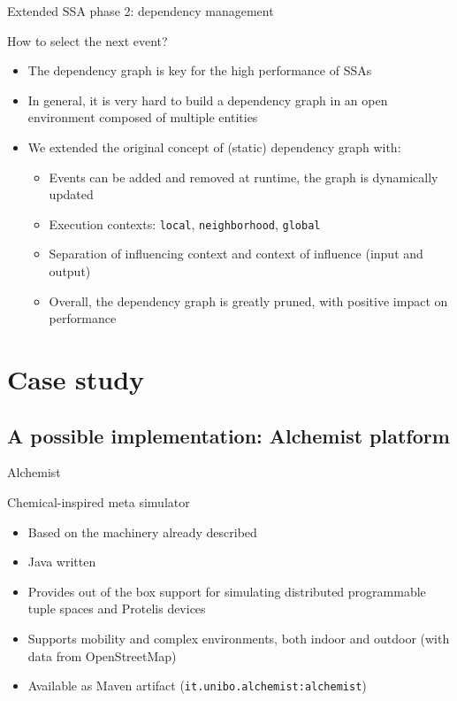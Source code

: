 \documentclass[presentation]{beamer} %
\begin{document}
\begin{frame}{Extended SSA phase 2: dependency management}
  \begin{block}{How to select the next event?}
    \begin{itemize}
      \item The dependency graph is key for the high performance of SSAs \cite{slepoy2008}
      \item In general, it is very hard to build a dependency graph in an open environment composed of multiple entities
      \item We extended the original concept of (static) dependency graph with:
      \begin{itemize}
        \item Events can be added and removed at runtime, the graph is dynamically updated
        \item Execution contexts: \texttt{local}, \texttt{neighborhood}, \texttt{global}
        \item Separation of influencing context and context of influence (input and output)
        \item Overall, the dependency graph is greatly pruned, with positive impact on performance
      \end{itemize}
    \end{itemize}
  \end{block}
\end{frame}


\section{Case study}



\subsection{A possible implementation: Alchemist platform}

\begin{frame}{Alchemist}
  \begin{block}{Chemical-inspired meta simulator}
    \begin{itemize}
      \item Based on the machinery already described
      \item Java written
      \item Provides out of the box support for simulating distributed programmable tuple spaces and Protelis \cite{protelis} devices
      \item Supports mobility and complex environments, both indoor and outdoor (with data from OpenStreetMap)
      \item Available as Maven artifact (\texttt{it.unibo.alchemist:alchemist})
    \end{itemize}
  \end{block}
\end{frame}
\end{document}
